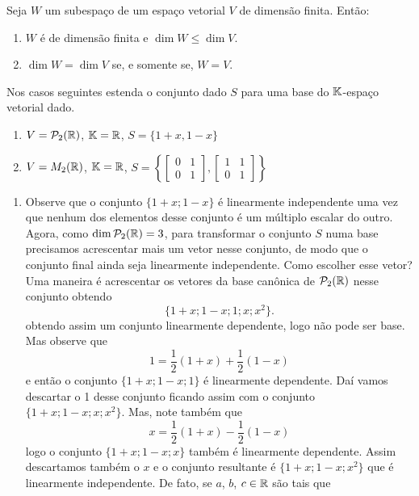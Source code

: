 \begin{teorema}
  Seja $W$ um subespaço de um espaço vetorial $V$ de dimensão finita. Então:
  \begin{enumerate}[label={\roman*})]
    \item $W$ é de dimensão finita e $\dim W \le \dim V$.

    \item $\dim W = \dim V$ se, e somente se, $W = V$.
  \end{enumerate}
\end{teorema}

\begin{exemplos}
  Nos casos seguintes estenda o conjunto dado $S$ para uma base do $\mathbb{K}$-espaço vetorial dado.
  \begin{enumerate}
    \item $V = \mathcal{P}_2(\mathbb{R})$, $\mathbb{K} = \mathbb{R}$, $S = \{1 + x, 1 - x\}$
    \item $V = M_2(\mathbb{R})$, $\mathbb{K} = \mathbb{R}$, $S = \left\{\begin{bmatrix}0 & 1\\0 & 1\end{bmatrix}, \begin{bmatrix}1 & 1\\0 & 1\end{bmatrix}\right\}$
  \end{enumerate}
  \begin{solucao}
    \begin{enumerate}
      \item Observe que o conjunto $\{1 + x; 1 - x\}$ é linearmente independente uma vez que nenhum dos elementos desse conjunto é um múltiplo escalar do outro. Agora, como $\dim\mathcal{P}_2(\mathbb{R}) = 3$, para transformar o conjunto $S$ numa base precisamos acrescentar mais um vetor nesse conjunto, de modo que o conjunto final ainda seja linearmente independente. Como escolher esse vetor?
        Uma maneira é acrescentar os vetores da base canônica de $\mathcal{P}_2(\mathbb{R})$ nesse conjunto obtendo
        \[
          \{1 + x; 1 - x; 1; x; x^2\}.
        \]
        obtendo assim um conjunto linearmente dependente, logo não pode ser base. Mas observe que
        \[
          1 = \dfrac{1}{2}(1 + x) + \dfrac{1}{2}(1 - x)
        \]
        e então o conjunto $\{1 + x; 1 - x; 1\}$ é linearmente dependente. Daí vamos descartar o 1 desse conjunto ficando assim com o conjunto $\{1 + x; 1 - x; x; x^2\}$. Mas, note também que
        \[
          x = \dfrac{1}{2}(1 + x) - \dfrac{1}{2}(1 - x)
        \]
        logo o conjunto $\{1 + x; 1 - x; x\}$ também é linearmente dependente. Assim descartamos também o $x$ e o conjunto resultante é $\{1 + x; 1 - x; x^2\}$ que é linearmente independente. De fato, se $a$, $b$, $c \in \mathbb{R}$ são tais que

\end{enumerate}
\end{solucao}
\end{exemplos}
